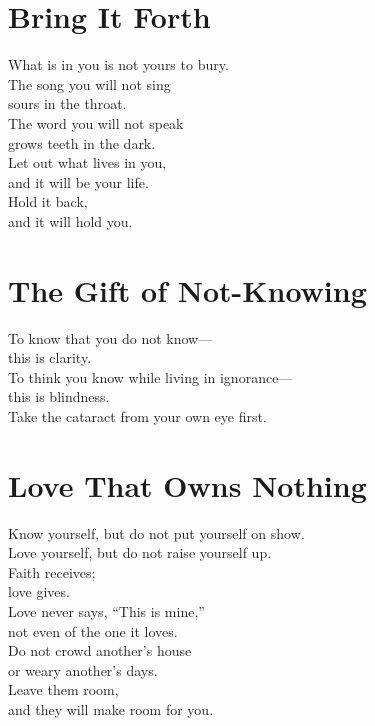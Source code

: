 \documentclass[10pt, openright]{book}
\newcommand{\sectionbreak}{\filbreak}
\newcommand{\sayingsource}[1]{\par\nopagebreak\vspace{0.3\baselineskip}{\raggedleft\footnotesize\itshape #1\par}}
\begin{document}
\sayingsource{Tao Te Ching 70}

\sectionbreak

\section{Bring It Forth}\label{bring-it-forth}

What is in you is not yours to bury.\\
The song you will not sing\\
sours in the throat.\\
The word you will not speak\\
grows teeth in the dark.\\
Let out what lives in you,\\
and it will be your life.\\
Hold it back,\\
and it will hold you.

\sayingsource{Thomas 70}

\sectionbreak

\section{The Gift of Not-Knowing}\label{the-gift-of-not-knowing}

To know that you do not know---\\
this is clarity.\\
To think you know while living in ignorance---\\
this is blindness.\\
Take the cataract from your own eye first.

\sayingsource{Tao Te Ching 71 · Thomas 26 · John 9:41 · Matthew 7:5}

\sectionbreak

\section{Love That Owns Nothing}\label{love-that-owns-nothing}

Know yourself, but do not put yourself on show.\\
Love yourself, but do not raise yourself up.\\
Faith receives;\\
love gives.\\
Love never says, ``This is mine,''\\
not even of the one it loves.\\
Do not crowd another's house\\
or weary another's days.\\
Leave them room,\\
and they will make room for you.
\end{document}
